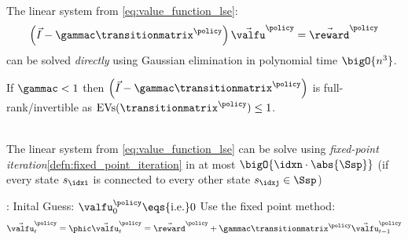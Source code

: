 \begin{corbox}\nospacing
  \begin{cor}\leavevmode\\
    The linear system from \cref{eq:value_function_lse}:
    \begin{align}
      \left(\vec{I}-\gammac\transitionmatrix^{\policy}\right)\vec{\valfu}^{\policy}=\vec{\reward}^{\policy}
    \end{align}
    can be solved \textit{directly} using Gaussian elimination in polynomial time $\bigO{n^{3}}$.
  \end{cor}
\end{corbox}
\begin{notebox}\nospacing
  If $\gammac<1$ then $\left(\vec{I}-\gammac\transitionmatrix^{\policy}\right)$ is full-rank/invertible as $\text{EVs}(\transitionmatrix^{\policy})\leq1$.
\end{notebox}
\begin{corbox}\nospacing
  \begin{cor}\leavevmode\\
    The linear system from \cref{eq:value_function_lse} can be solve
    using \textit{fixed-point iteration}\cref{defn:fixed_point_iteration} in at most $\bigO{\idxn\cdot\abs{\Ssp}}$
    (if every state $s_{\idxi}$ is connected to every other state $s_{\idxj}\in\Ssp$)
  \end{cor}
\end{corbox}
\begin{algorithmbox}\nospacing
  \begin{algo}\leavevmode
    \begin{algorithmic}[1]
      \item[] : Inital Guess: $\valfu_{0}^{\policy}\eqs{\text{i.e.}}0$
        \State Use the fixed point method:
        \begin{align}
          \vec{\valfu}_{t}^{\policy}=\phic\vec{\valfu}_{t}^{\policy}=\vec{\reward}^{\policy}+\gammac\transitionmatrix^{\policy}\vec{\valfu}_{t-1}^{\policy}
        \end{align}
        \EndFor
    \end{algorithmic}
  \end{algo}
\end{algorithmbox}
